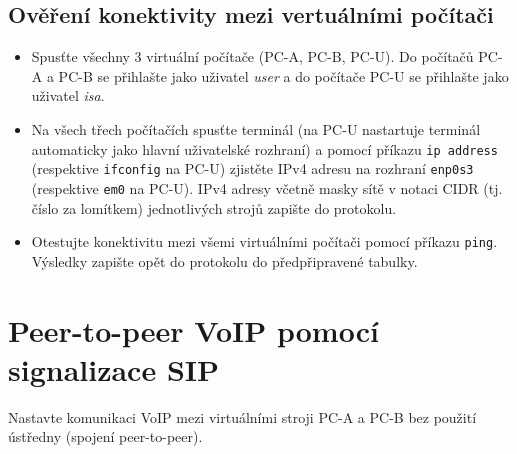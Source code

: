 \subsection{Ověření konektivity mezi vertuálními počítači}
\begin{itemize}
	\item Spusťte všechny 3 virtuální počítače (PC-A, PC-B, PC-U). Do počítačů PC-A a PC-B se přihlašte jako uživatel \emph{user} a do počítače PC-U se přihlašte jako uživatel \emph{isa}.
	\item Na všech třech počítačích spusťte terminál (na PC-U nastartuje terminál automaticky jako hlavní uživatelské rozhraní) a pomocí příkazu \verb{ip address{ (respektive \verb{ifconfig{ na PC-U) zjistěte IPv4 adresu na rozhraní \verb{enp0s3{ (respektive \verb{em0{ na PC-U). IPv4 adresy včetně masky sítě v notaci CIDR (tj. číslo za lomítkem) jednotlivých strojů zapište do protokolu.
	\item Otestujte konektivitu mezi všemi virtuálními počítači pomocí příkazu \verb{ping{. Výsledky zapište opět do protokolu do předpřipravené tabulky.
\end{itemize}


\section{Peer-to-peer VoIP pomocí signalizace SIP}
Nastavte komunikaci VoIP mezi virtuálními stroji PC-A a PC-B bez použití ústředny (spojení peer-to-peer).

